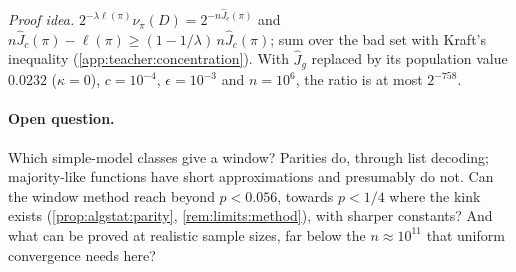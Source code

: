 \emph{Proof idea.} $2^{-\lambda\ell(\pi)}\nu_\pi(D)=2^{-n\hat J_c(\pi)}$ and $n\hat J_c(\pi)-\ell(\pi)\ge(1-1/\lambda)\,n\hat J_c(\pi)$; sum over the bad set with Kraft's inequality (\cref{app:teacher:concentration}). With $\hat J_g$ replaced by its population value $0.0232$ ($\kappa=0$), $c=10^{-4}$, $\epsilon=10^{-3}$ and $n=10^6$, the ratio is at most $2^{-758}$.

\paragraph{Open question.}\label{q:teacher:open}
Which simple-model classes give a window? Parities do, through list decoding; majority-like functions have short approximations and presumably do not. Can the window method reach beyond $p<0.056$, towards $p<1/4$ where the kink exists (\cref{prop:algstat:parity}, \cref{rem:limits:method}), with sharper constants? And what can be proved at realistic sample sizes, far below the $n\approx10^{11}$ that uniform convergence needs here?
